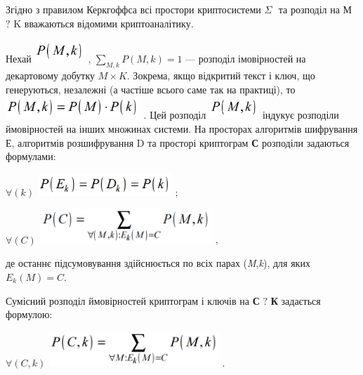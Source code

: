  Згідно з правилом Керкгоффса  всі простори криптосистеми   ${\Sigma }$ $ $ та
розподіл на  М ${?}$ K  вважаються відомими криптоаналітику.


\bigskip

Нехай 
\includegraphics[width=0.7437in,height=0.3339in]{crypt-img/crypt-img13.png} , 
${\underset{{M,k}}{\sum }{P(M,k)=1}}$  --- розподіл імовірностей на декартовому
добутку  ${M\times K}$. Зокрема, якщо відкритий текст і ключ, що генеруються,
незалежні (а частіше всього саме так на практиці), то 
\includegraphics[width=1.9992in,height=0.3346in]{crypt-img/crypt-img14.png} .
Цей розподіл 
\includegraphics[width=0.7437in,height=0.3339in]{crypt-img/crypt-img15.png}  
індукує розподіли ймовірностей на інших множинах системи.  На просторах
алгоритмів шифрування Е, алгоритмів розшифрування  D та просторі  криптограм 
\textbf{С}  розподіли задаються формулами:

{\centering
 ${\forall (k)}$  
\includegraphics[width=1.9898in,height=0.3335in]{crypt-img/crypt-img16.png} ;
\par}

{\centering
 ${\forall (C)}$   
\includegraphics[width=2.5583in,height=0.5154in]{crypt-img/crypt-img17.png} ,
\par}

де останнє підсумовування здійснюється по всіх парах
(\textit{M},\textit{k}),\textit{ }для яких  ${E_{{k}}(M)=C}$.

Сумісний розподіл ймовірностей  криптограм і ключів  на \textbf{С} ${?}$
\textbf{К} задається формулою:

{\centering
 ${\forall (C,k)}$    
\includegraphics[width=2.5201in,height=0.5209in]{crypt-img/crypt-img18.png} .
\par}

